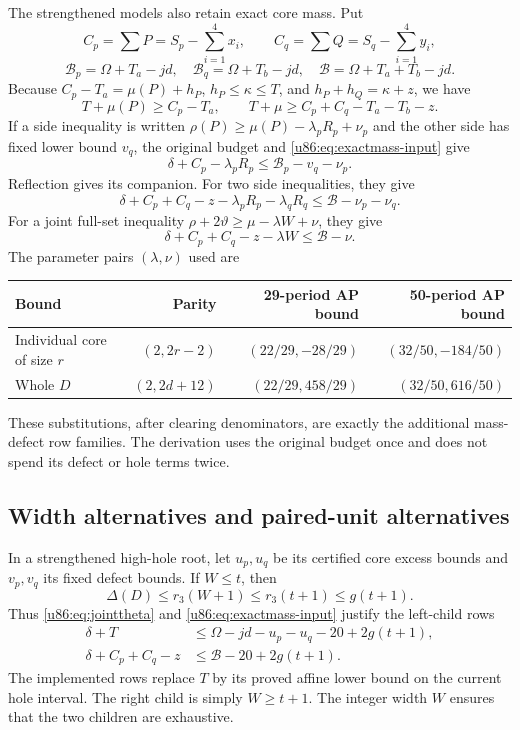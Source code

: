 \documentclass[11pt,a4paper]{article}
\theoremstyle{remark}
\begin{document}
The strengthened models also retain exact core mass. Put
\[
 C_p=\sum P=S_p-\sum_{i=1}^4x_i,\qquad
 C_q=\sum Q=S_q-\sum_{i=1}^4y_i,
\]
\[
 \mathcal B_p=\Omega+T_a-jd,\quad \mathcal B_q=\Omega+T_b-jd,\quad
 \mathcal B=\Omega+T_a+T_b-jd.
\]
Because $C_p-T_a=\mu(P)+h_P$, $h_P\le\kappa\le T$, and
$h_P+h_Q=\kappa+z$, we have
\begin{equation}\label{u86:eq:exactmass-input}
 T+\mu(P)\ge C_p-T_a,\qquad
 T+\mu\ge C_p+C_q-T_a-T_b-z.
\end{equation}
If a side inequality is written
$\rho(P)\ge\mu(P)-\lambda_pR_p+\nu_p$ and the other side has fixed
lower bound $v_q$, the original budget and \eqref{u86:eq:exactmass-input}
give
\begin{equation}\label{u86:eq:exactmass-one}
 \delta+C_p-\lambda_pR_p\le\mathcal B_p-v_q-\nu_p.
\end{equation}
Reflection gives its companion. For two side inequalities, they give
\begin{equation}\label{u86:eq:exactmass-two}
 \delta+C_p+C_q-z-\lambda_pR_p-\lambda_qR_q
 \le\mathcal B-\nu_p-\nu_q.
\end{equation}
For a joint full-set inequality
$\rho+2\vartheta\ge\mu-\lambda W+\nu$, they give
\begin{equation}\label{u86:eq:exactmass-whole}
 \delta+C_p+C_q-z-\lambda W\le\mathcal B-\nu.
\end{equation}
The parameter pairs $(\lambda,\nu)$ used are
\begin{center}\small
\begin{tabular}{lrrr}
\toprule
Bound&Parity&29-period AP bound&50-period AP bound\\\midrule
Individual core of size $r$&$(2,2r-2)$&$(22/29,-28/29)$&$(32/50,-184/50)$\\
Whole $D$&$(2,2d+12)$&$(22/29,458/29)$&$(32/50,616/50)$\\\bottomrule
\end{tabular}
\end{center}
These substitutions, after clearing denominators, are exactly the
additional mass-defect row families. The derivation uses the original
budget once and does not spend its defect or hole terms twice.

\subsection{Width alternatives and paired-unit alternatives}
In a strengthened high-hole root, let $u_p,u_q$ be its certified core
excess bounds and $v_p,v_q$ its fixed defect bounds. If $W\le t$, then
\[
 \Delta(D)\le r_3(W+1)\le r_3(t+1)\le g(t+1).
\]
Thus \eqref{u86:eq:jointtheta} and \eqref{u86:eq:exactmass-input} justify the
left-child rows
\begin{align*}
 \delta+T&\le\Omega-jd-u_p-u_q-20+2g(t+1),\\
 \delta+C_p+C_q-z&\le\mathcal B-20+2g(t+1).
\end{align*}
The implemented rows replace $T$ by its proved affine lower bound
on the current hole interval. The right child is simply $W\ge t+1$.
The integer width $W$ ensures that the two children are exhaustive.
\end{document}
